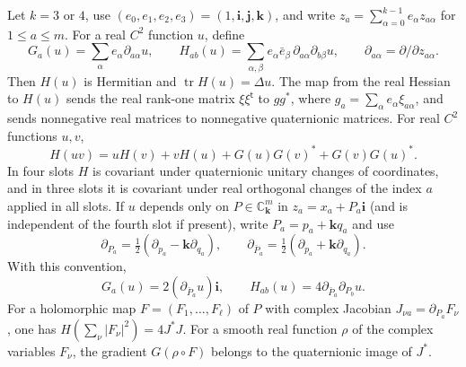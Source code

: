 Let $k=3$ or $4$, use $(e_0,e_1,e_2,e_3)=(1,\mathbf i,\mathbf j,\mathbf k)$, and write $z_a=\sum_{\alpha=0}^{k-1}e_\alpha z_{a\alpha}$ for $1\le a\le m$. For a real $C^2$ function $u$, define
\[
G_a(u)=\sum_\alpha e_\alpha\partial_{a\alpha}u,\qquad
H_{ab}(u)=\sum_{\alpha,\beta}e_\alpha\bar e_\beta\,
       \partial_{a\alpha}\partial_{b\beta}u,\qquad
\partial_{a\alpha}=\partial/\partial z_{a\alpha}.
\]
Then $H(u)$ is Hermitian and $\operatorname{tr}H(u)=\Delta u$. The map from the real Hessian to $H(u)$ sends the real rank-one matrix $\xi\xi^{\mathsf t}$ to $gg^*$, where $g_a=\sum_\alpha e_\alpha\xi_{a\alpha}$, and sends nonnegative real matrices to nonnegative quaternionic matrices. For real $C^2$ functions $u,v$,
\[
H(uv)=uH(v)+vH(u)+G(u)G(v)^*+G(v)G(u)^* .
\]
In four slots $H$ is covariant under quaternionic unitary changes of coordinates, and in three slots it is covariant under real orthogonal changes of the index $a$ applied in all slots. If $u$ depends only on $P\in\mathbb C_{\mathbf k}^m$ in $z_a=x_a+P_a\mathbf i$ (and is independent of the fourth slot if present), write $P_a=p_a+\mathbf k q_a$ and use
\[
\partial_{P_a}=\tfrac12(\partial_{p_a}-\mathbf k\partial_{q_a}),\qquad
\partial_{\bar P_a}=\tfrac12(\partial_{p_a}+\mathbf k\partial_{q_a}).
\]
With this convention,
\[
G_a(u)=2(\partial_{\bar P_a}u)\mathbf i,\qquad
H_{ab}(u)=4\partial_{\bar P_a}\partial_{P_b}u .
\]
For a holomorphic map $F=(F_1,\ldots,F_\ell)$ of $P$ with complex Jacobian $J_{\nu a}=\partial_{P_a}F_\nu$, one has $H(\sum_\nu|F_\nu|^2)=4J^*J$. For a smooth real function $\rho$ of the complex variables $F_\nu$, the gradient $G(\rho\circ F)$ belongs to the quaternionic image of $J^*$.
